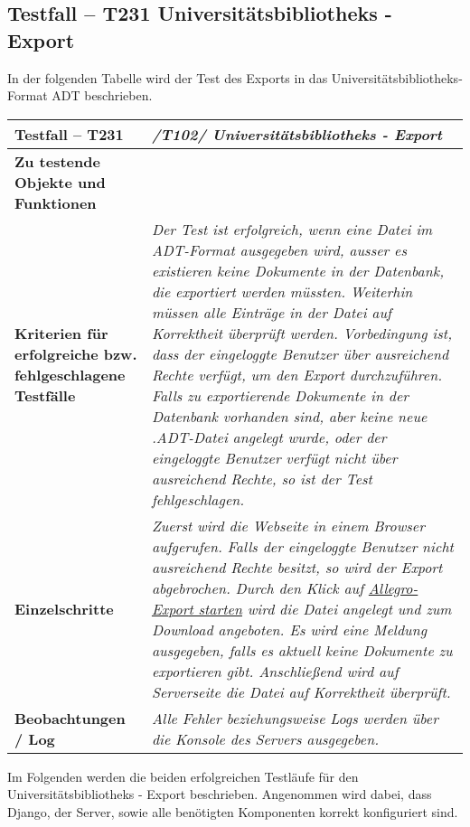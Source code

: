 \subsection{Testfall -- T231 Universitätsbibliotheks - Export}
In der folgenden Tabelle wird der Test des Exports in das
Universitätsbibliotheks-Format ADT beschrieben.
\begin{longtable}{|p{5cm}|p{10cm}|}
\hline
\textbf{Testfall -- T231 } &  \textit{/T102/ Universitätsbibliotheks - Export} \\
\hline
\textbf{Zu testende Objekte und Funktionen} & 
\textit{
\begin{itemize}
  \item In Komponente \emph{Server (App: Documents)} die Funktion
	\lstinline{extras_allegro.export_allegro()}
\end{itemize} } \\
\hline
\textbf{Kriterien f\"ur erfolgreiche bzw. fehlgeschlagene Testf\"alle} &
\textit{Der Test ist erfolgreich, wenn eine Datei im ADT-Format ausgegeben
wird, ausser es existieren keine Dokumente in der Datenbank, die exportiert
werden müssten. Weiterhin müssen alle Einträge in der Datei auf Korrektheit
überprüft werden. Vorbedingung ist, dass der eingeloggte Benutzer über
ausreichend Rechte verfügt, um den Export durchzuführen. Falls zu exportierende
Dokumente in der Datenbank vorhanden sind, aber keine neue .ADT-Datei angelegt
wurde, oder der eingeloggte Benutzer verfügt nicht über ausreichend Rechte, so
ist der Test fehlgeschlagen. } \\
\hline
\textbf{Einzelschritte} & 
\textit{Zuerst wird die Webseite in einem Browser aufgerufen. Falls der
eingeloggte Benutzer nicht ausreichend Rechte besitzt, so wird der Export
abgebrochen. Durch den Klick auf \uline{Allegro-Export starten} wird die Datei angelegt und
zum Download angeboten. Es wird eine Meldung ausgegeben, falls es aktuell keine
Dokumente zu exportieren gibt. Anschließend wird auf Serverseite die Datei auf
Korrektheit überprüft. } \\
\hline
\textbf{Beobachtungen / Log} &  \textit{Alle Fehler beziehungsweise Logs werden
über die Konsole des Servers ausgegeben. } \\
\hline

 \end{longtable}

Im Folgenden werden die beiden erfolgreichen Testläufe für den
Universitätsbibliotheks - Export beschrieben. Angenommen wird dabei, dass
Django, der Server, sowie alle benötigten Komponenten korrekt konfiguriert
sind.

